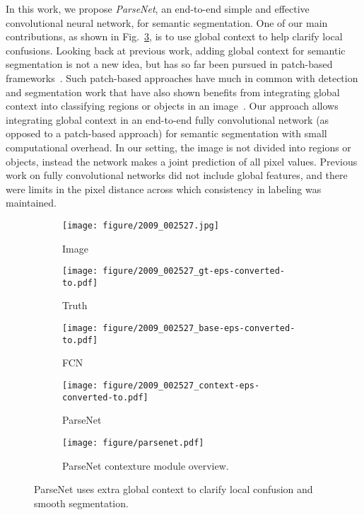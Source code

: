 \documentclass{article} \usepackage{iclr2016_conference}
\begin{document}
In this work, we propose \emph{ParseNet}, an end-to-end simple and effective convolutional neural network, for semantic segmentation. One of our main contributions, as shown in Fig.~\ref{fig:system}, is to use global context to help clarify local confusions. Looking back at previous work, adding global context for semantic segmentation is not a new idea, but has so far been pursued in patch-based frameworks~\cite{lucchi2011spatial}. Such patch-based approaches have much in common with detection and segmentation work that have also shown benefits from integrating global context into classifying regions or objects in an image~\cite{szegedy2014scalable, mostajabi2014feedforward}. Our approach allows integrating global context in an end-to-end fully convolutional network (as opposed to a patch-based approach) for semantic segmentation with small computational overhead. In our setting, the image is not divided into regions or objects, instead the network makes a joint prediction of all pixel values. Previous work on fully convolutional networks did not include global features, and there were limits in the pixel distance across which consistency in labeling was maintained.
\begin{figure}[tbp]
\centering
\begin{subfigure}[b]{0.109\linewidth}
	\texttt{[image: figure/2009\_002527.jpg]}
	\caption{\footnotesize{Image}}
\end{subfigure}
\begin{subfigure}[b]{0.112\linewidth}
	\texttt{[image: figure/2009\_002527\_gt-eps-converted-to.pdf]}
	\caption{\footnotesize{Truth}}
\end{subfigure}
\begin{subfigure}[b]{0.112\linewidth}
	\texttt{[image: figure/2009\_002527\_base-eps-converted-to.pdf]}
	\caption{\footnotesize{FCN}}
	\label{fig:fcnoutput}
\end{subfigure}
\begin{subfigure}[b]{0.113\linewidth}
	\texttt{[image: figure/2009\_002527\_context-eps-converted-to.pdf]}
	\caption{ParseNet}
	\label{fig:parsenetoutput}
\end{subfigure}
\hspace{0.2em}
\begin{subfigure}[b]{0.52\linewidth}
	\texttt{[image: figure/parsenet.pdf]}
	\caption{ParseNet contexture module overview.}
\end{subfigure}
\caption{ParseNet uses extra global context to clarify local confusion and smooth segmentation.}
\label{fig:system}
\end{figure}
\end{document}
